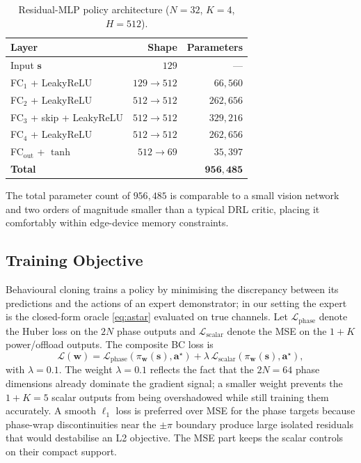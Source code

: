 \documentclass[journal]{IEEEtran}
\newcommand{\vect}[1]{\bm{#1}}
\newcommand{\Loss}{\mathcal{L}}
\begin{document}
\begin{table}[t]
\centering
\caption{Residual-MLP policy architecture ($N\!=\!32$, $K\!=\!4$,
$H\!=\!512$).}
\label{tab:arch}
\begin{tabular}{lrr}
\toprule
\textbf{Layer} & \textbf{Shape} & \textbf{Parameters} \\
\midrule
Input $\vect{s}$              & $129$           & ---         \\
FC$_1$ + LeakyReLU            & $129\to512$     & $66{,}560$  \\
FC$_2$ + LeakyReLU            & $512\to512$     & $262{,}656$ \\
FC$_3$ + skip + LeakyReLU     & $512\to512$     & $329{,}216$ \\
FC$_4$ + LeakyReLU            & $512\to512$     & $262{,}656$ \\
FC$_\mathrm{out}$ + $\tanh$   & $512\to69$      & $35{,}397$  \\
\midrule
\textbf{Total}                &                 & $\mathbf{956{,}485}$ \\
\bottomrule
\end{tabular}
\end{table}

The total parameter count of $956{,}485$ is comparable to a small
vision network and two orders of magnitude smaller than a typical
DRL critic, placing it comfortably within edge-device memory
constraints.

\subsection{Training Objective}

Behavioural cloning \cite{pomerleau1991efficient,ross2011reduction}
trains a policy by minimising the discrepancy between its predictions
and the actions of an expert demonstrator; in our setting the expert
is the closed-form oracle \eqref{eq:astar} evaluated on true channels.
Let $\Loss_{\mathrm{phase}}$ denote the Huber loss on the $2N$ phase
outputs and $\Loss_{\mathrm{scalar}}$ denote the MSE on the $1+K$
power/offload outputs. The composite BC loss is
\begin{equation}
  \Loss(\vect{w})=
     \Loss_{\mathrm{phase}}(\pi_{\vect{w}}(\vect{s}),\vect{a}^{\star})
   + \lambda\,\Loss_{\mathrm{scalar}}(\pi_{\vect{w}}(\vect{s}),\vect{a}^{\star}),
  \label{eq:loss}
\end{equation}
with $\lambda\!=\!0.1$. The weight $\lambda\!=\!0.1$ reflects the
fact that the $2N\!=\!64$ phase dimensions already dominate the
gradient signal; a smaller weight prevents the $1\!+\!K\!=\!5$
scalar outputs from being overshadowed while still training them
accurately. A smooth $\ell_1$ loss \cite{huber1964robust} is preferred over
MSE for the phase targets because phase-wrap discontinuities near
the $\pm\pi$ boundary produce large isolated residuals that would
destabilise an L2 objective. The MSE part keeps the scalar controls
on their compact support.
\end{document}
